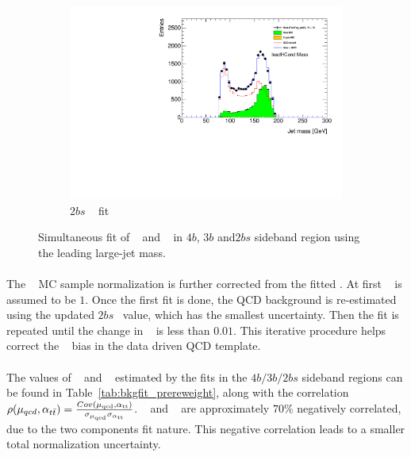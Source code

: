 \begin{figure}[htbp!]
    \hspace{-4cm}
    \begin{subfigure}[b]{0.3\textwidth}
        \includegraphics[width=\textwidth,angle=-90]{figures/boosted/Fit/fitNorm_i2s.pdf}
        \caption{$2bs$ \mleadJ~ fit}
        \label{fig:ttbar-fit-2bs}
    \end{subfigure}
   \caption{Simultaneous fit of \muqcd~ and \alphatt~ in $4b$, $3b$ and$2bs$ sideband region using the leading large-\R jet mass.}
  \label{fig:ttbar-fit}
\end{figure}

\paragraph{}
The \ttbar~ MC sample normalization is further corrected from the fitted \alphatt.
At first \alphatt~ is assumed to be $1$.
Once the first fit is done, the QCD background is re-estimated using the updated $2bs$ \alphatt~value, which has the smallest uncertainty.
Then the fit is repeated until the change in \alphatt~ is less than $0.01$.
This iterative procedure helps correct the \alphatt~ bias in the data driven QCD template.

\paragraph{}
The values of \muqcd~ and \alphatt~ estimated by the fits in the $4b/3b/2bs$ sideband regions can be found in Table~\ref{tab:bkgfit_prereweight}, along with the correlation $\rho(\mu_{qcd},\alpha_{t\bar{t}}) = \frac{Cov(\rm \mu_{qcd},\rm \alpha_{tt})}{\rm \sigma_{\mu_{qcd}} \rm \sigma_{\alpha_{tt}} }$. 
\muqcd~ and \alphatt~  are approximately $70\%$ negatively correlated, due to the two components fit nature.
This negative correlation leads to a smaller total normalization uncertainty.

